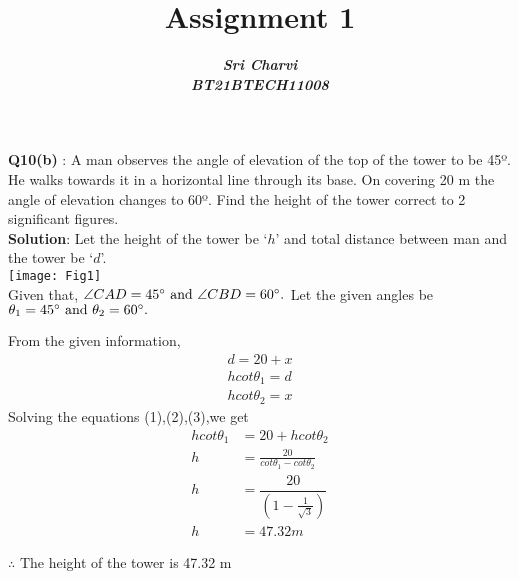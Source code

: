 \documentclass[journal,12pt,twocolumn]{IEEEtran}
\title{ Assignment 1}
\author{\textbf{\textit{Sri Charvi}}\\
\textbf{\textit{BT21BTECH11008}}}
\begin{document}
\maketitle
\textbf{Q10(b) }: A man observes the angle of elevation of the top of the tower to be 45º.
 He walks towards it in a horizontal line through its base. On covering 20 m the angle of 
elevation changes to 60º. Find the height of the tower correct to 2 significant figures.\\

\medskip
\textbf{Solution}: Let the height of the tower be `$h$' and total distance between man and the tower be `$d$'.\\

\texttt{[image: Fig1]}\\
Given that, $ \angle CAD=45\degree \text{ and } \angle CBD=60\degree.$ Let the given angles
be $\theta_1=45\degree \text{ and } \theta_2=60\degree.$

From the given information,
\begin{align}
d=20+x\\
hcot\theta_1=d\\
hcot\theta_2=x
\end{align}
Solving the equations (1),(2),(3),we get
\begin{align*}
 hcot\theta_1&=20+hcot\theta_2\\
 h&=\frac{20}{cot\theta_1-cot\theta_2}\\
 h&=\dfrac{20}{\left(1-\frac{1}{\sqrt{3}}\right)}\\
 h &= 47.32m
\end{align*}

$\therefore $ The height of the tower is 47.32 m
\end{document}
